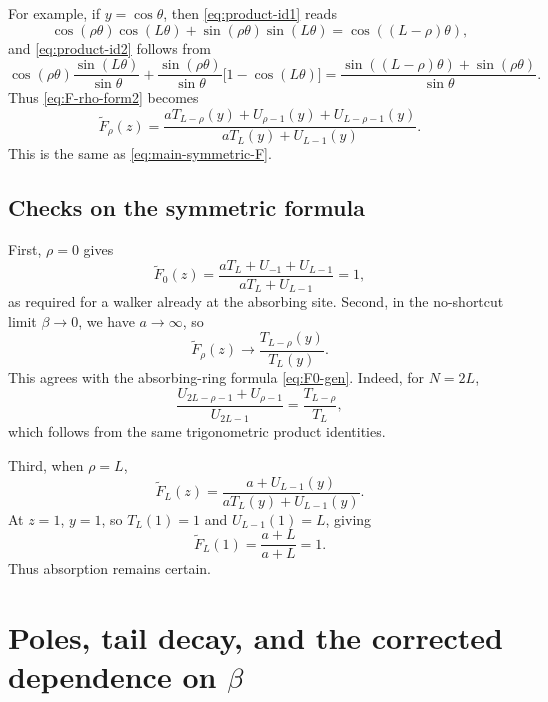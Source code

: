 \documentclass[11pt]{article}
\newcommand{\wt}{\widetilde}
\begin{document}
For example, if $y=\cos\theta$, then \eqref{eq:product-id1} reads
\begin{equation}
  \cos(\rho\theta)\cos(L\theta)+\sin(\rho\theta)\sin(L\theta)
  =\cos((L-\rho)\theta),
\end{equation}
and \eqref{eq:product-id2} follows from
\begin{equation}
  \cos(\rho\theta)\frac{\sin(L\theta)}{\sin\theta}
  +\frac{\sin(\rho\theta)}{\sin\theta}\bigl[1-\cos(L\theta)\bigr]
  =\frac{\sin((L-\rho)\theta)+\sin(\rho\theta)}{\sin\theta}.
\end{equation}
Thus \eqref{eq:F-rho-form2} becomes
\begin{equation}
  \boxed{
  \wt F_\rho(z)=
  \frac{aT_{L-\rho}(y)+U_{\rho-1}(y)+U_{L-\rho-1}(y)}
  {aT_L(y)+U_{L-1}(y)}.}
  \label{eq:F-rho-final}
\end{equation}
This is the same as \eqref{eq:main-symmetric-F}.

\subsection{Checks on the symmetric formula}

First, $\rho=0$ gives
\begin{equation}
  \wt F_0(z)=\frac{aT_L+U_{-1}+U_{L-1}}{aT_L+U_{L-1}}=1,
\end{equation}
as required for a walker already at the absorbing site.  Second, in the no-shortcut limit
$\beta\to0$, we have $a\to\infty$, so
\begin{equation}
  \wt F_\rho(z)\to\frac{T_{L-\rho}(y)}{T_L(y)}.
\end{equation}
This agrees with the absorbing-ring formula \eqref{eq:F0-gen}.  Indeed, for $N=2L$,
\begin{equation}
  \frac{U_{2L-\rho-1}+U_{\rho-1}}{U_{2L-1} }
  =\frac{T_{L-\rho}}{T_L},
\end{equation}
which follows from the same trigonometric product identities.

Third, when $\rho=L$,
\begin{equation}
  \wt F_L(z)=\frac{a+U_{L-1}(y)}{aT_L(y)+U_{L-1}(y)}.
\end{equation}
At $z=1$, $y=1$, so $T_L(1)=1$ and $U_{L-1}(1)=L$, giving
\begin{equation}
  \wt F_L(1)=\frac{a+L}{a+L}=1.
\end{equation}
Thus absorption remains certain.

\section{Poles, tail decay, and the corrected dependence on \texorpdfstring{$\beta$}{beta}}
\label{sec:poles-tail}
\end{document}
